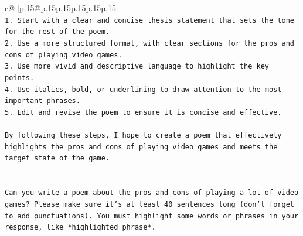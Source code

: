 \documentclass{article}
\begin{document}
{\begin{supertabular}{c@{$\;$}|p{.15\linewidth}@{}p{.15\linewidth}p{.15\linewidth}p{.15\linewidth}p{.15\linewidth}p{.15\linewidth}}
{{{\\ 
\texttt{1. Start with a clear and concise thesis statement that sets the tone for the rest of the poem.} \\
\texttt{2. Use a more structured format, with clear sections for the pros and cons of playing video games.} \\
\texttt{3. Use more vivid and descriptive language to highlight the key points.} \\
\texttt{4. Use italics, bold, or underlining to draw attention to the most important phrases.} \\
\texttt{5. Edit and revise the poem to ensure it is concise and effective.} \\
\\ 
\texttt{By following these steps, I hope to create a poem that effectively highlights the pros and cons of playing video games and meets the target state of the game.} \\
\\ 
\\ 
\texttt{Can you write a poem about the pros and cons of playing a lot of video games? Please make sure it's at least 40 sentences long (don't forget to add punctuations). You must highlight some words or phrases in your response, like *highlighted phrase*.} \\
            }
        }
    }
     \\ \\


\end{supertabular}}
\end{document}
